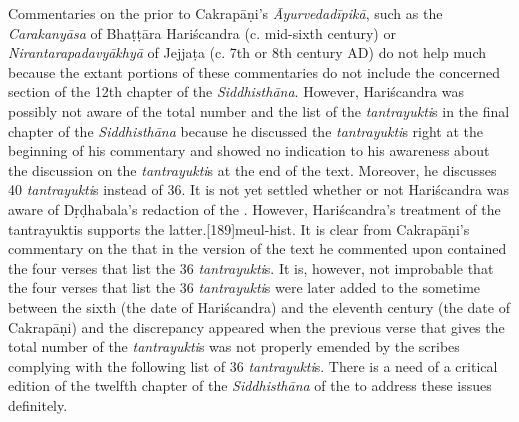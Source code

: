 Commentaries on the \CS prior to Cakrapāṇi's \emph{Āyurvedadīpikā}, such as the 
\emph{Carakanyāsa} of Bhaṭṭāra Hariścandra (c. mid-sixth century) or 
\emph{Nirantarapadavyākhyā} of Jejjaṭa (c. 7th or 8th century AD) do not help 
much because the extant portions of these commentaries do not include the 
concerned section of the 12th chapter of the \emph{Siddhisthāna}. However, Hariścandra was possibly not aware of the total 
number and the list of the \emph{tantrayukti}s in the final chapter of the 
\emph{Siddhisthāna} because he discussed the \emph{tantrayukti}s right at the 
beginning of his commentary and showed no indication to his awareness about the 
discussion on the \emph{tantrayukti}s at the end of the text. Moreover, he 
discusses 40 \emph{tantrayukti}s instead of 36. It is not yet settled whether or not 
Hariścandra was aware of Dṛḍhabala's redaction of the \CS. However, Hariścandra's 
treatment of the tantrayuktis supports the latter.[189]{meul-hist}.  It 
is clear from Cakrapāṇi's commentary on the \CS that in the version of the text he 
commented upon contained the four verses that list the 36 \emph{tantrayukti}s. It 
is, however, not improbable that the four verses that list the 36 
\emph{tantrayukti}s were later added to the \CS sometime between the sixth (the 
date of Hariścandra) and the eleventh century (the date of Cakrapāṇi) and the 
discrepancy appeared when the previous verse that gives the total number of the 
\emph{tantrayukti}s was not properly emended by the scribes complying with the 
following list of 36 \emph{tantrayukti}s. There is a need of a critical edition of the 
twelfth chapter of the \emph{Siddhisthāna} of the \CS to address these issues 
definitely.  

